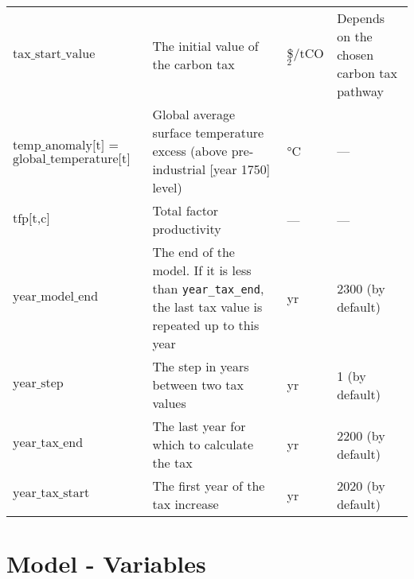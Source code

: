\documentclass[
]{article}
\begin{document}
\begin{longtable}{|p{1.5in}|p{2.5in}|p{0.9in}|p{0.7in}|}
  \(\text{tax\_start\_value}\) & The initial value of the carbon tax & \$/tCO$_2$ & Depends on the chosen carbon tax pathway \\
  \(\text{temp\_anomaly[t]}\) = \(\text{global\_temperature[t]}\) & Global average surface temperature excess (above pre-industrial {[}year 1750{]} level) & °C & — \\
  \(\text{tfp[t,c]}\) & Total factor productivity & — & — \\
  \(\text{year\_model\_end}\) & The end of the model. If it is less than \texttt{year\_tax\_end}, the last tax value is repeated up to this year & yr & 2300 (by default) \\
  \(\text{year\_step}\) & The step in years between two tax values & yr & 1 (by default) \\
  \(\text{year\_tax\_end}\) & The last year for which to calculate the tax & yr & 2200 (by default) \\
  \(\text{year\_tax\_start}\) & The first year of the tax increase & yr & 2020 (by default) \\
  \hline
\end{longtable}



\section{Model - Variables}
\end{document}
